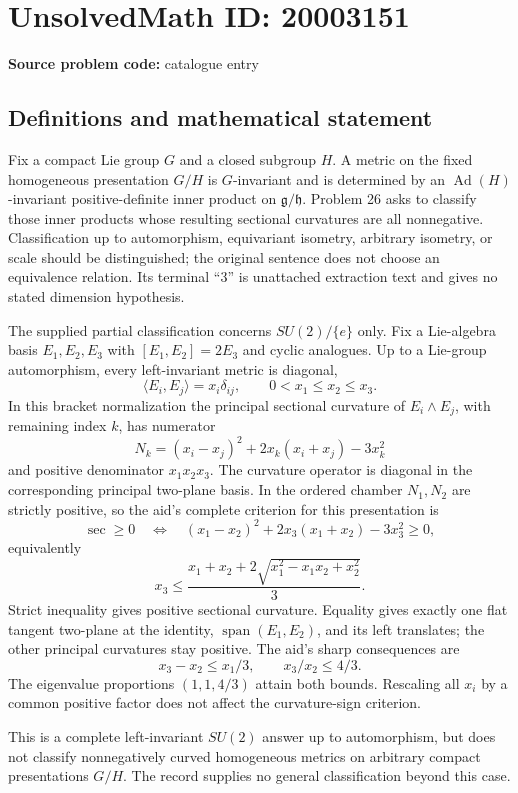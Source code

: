 \documentclass[11pt]{article}
\begin{document}
\section*{UnsolvedMath ID: 20003151}
\textbf{Source problem code:} catalogue entry
\subsection{Definitions and mathematical statement}
Fix a compact Lie group $G$ and a closed subgroup $H$. A metric on the fixed homogeneous presentation $G/H$ is $G$-invariant and is determined by an $\operatorname{Ad}(H)$-invariant positive-definite inner product on $\mathfrak g/\mathfrak h$. Problem 26 asks to classify those inner products whose resulting sectional curvatures are all nonnegative. Classification up to automorphism, equivariant isometry, arbitrary isometry, or scale should be distinguished; the original sentence does not choose an equivalence relation. Its terminal ``3'' is unattached extraction text and gives no stated dimension hypothesis.

The supplied partial classification concerns $SU(2)/\{e\}$ only. Fix a Lie-algebra basis $E_1,E_2,E_3$ with $[E_1,E_2]=2E_3$ and cyclic analogues. Up to a Lie-group automorphism, every left-invariant metric is diagonal,
\[
 \langle E_i,E_j\rangle=x_i\delta_{ij},\qquad
 0<x_1\leq x_2\leq x_3.
\]
In this bracket normalization the principal sectional curvature of $E_i\wedge E_j$, with remaining index $k$, has numerator
\[
 N_k=(x_i-x_j)^2+2x_k(x_i+x_j)-3x_k^2
\]
and positive denominator $x_1x_2x_3$. The curvature operator is diagonal in the corresponding principal two-plane basis. In the ordered chamber $N_1,N_2$ are strictly positive, so the aid's complete criterion for this presentation is
\[
 \sec\geq0\quad\Longleftrightarrow\quad
 (x_1-x_2)^2+2x_3(x_1+x_2)-3x_3^2\geq0,
\]
equivalently
\[
 x_3\leq\frac{x_1+x_2+2\sqrt{x_1^2-x_1x_2+x_2^2}}3.
\]
Strict inequality gives positive sectional curvature. Equality gives exactly one flat tangent two-plane at the identity, $\operatorname{span}(E_1,E_2)$, and its left translates; the other principal curvatures stay positive. The aid's sharp consequences are
\[
 x_3-x_2\leq x_1/3,\qquad x_3/x_2\leq4/3.
\]
The eigenvalue proportions $(1,1,4/3)$ attain both bounds. Rescaling all $x_i$ by a common positive factor does not affect the curvature-sign criterion.

This is a complete left-invariant $SU(2)$ answer up to automorphism, but does not classify nonnegatively curved homogeneous metrics on arbitrary compact presentations $G/H$. The record supplies no general classification beyond this case.
\end{document}
